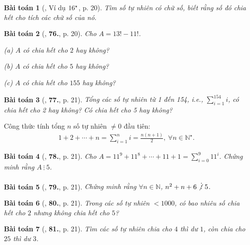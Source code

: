 \documentclass[oneside]{book}
\numberwithin{equation}{section}
\newtheorem{baitoan}{Bài toán}[section]
\begin{document}
\begin{baitoan}[\cite{Binh_Toan_6_tap_1}, Ví dụ $\rm 16^\star$, p. 20]
	Tìm số tự nhiên có chữ số, biết rằng số đó chia hết cho tích các chữ số của nó.
\end{baitoan}

\begin{baitoan}[\cite{Binh_Toan_6_tap_1}, \textbf{76.}, p. 20]
	Cho $A = 13! - 11!$.
	\begin{enumerate*}
		\item[(a)] $A$ có chia hết cho $2$ hay không?
		\item[(b)] $A$ có chia hết cho $5$ hay không?
		\item[(c)] $A$ có chia hết cho $155$ hay không?
	\end{enumerate*}
\end{baitoan}

\begin{baitoan}[\cite{Binh_Toan_6_tap_1}, \textbf{77.}, p. 21]
	Tổng các số tự nhiên từ 1 đến 154, i.e., $\sum_{i=1}^{154} i$, có chia hết cho 2 hay không? Có chia hết cho 5 hay không?
\end{baitoan}
Công thức tính tổng $n$ số tự nhiên $\ne 0$ đầu tiên:
\begin{align*}
	\boxed{1 + 2 + \cdots + n = \sum_{i=1}^n i = \frac{n(n + 1)}{2},\ \forall n\in\mathbb{N}^\star.}
\end{align*}

\begin{baitoan}[\cite{Binh_Toan_6_tap_1}, \textbf{78.}, p. 21]
	Cho $A = 11^9 + 11^8 + \cdots + 11 + 1 = \sum_{i=0}^9 11^i$. Chứng minh rằng $A\ \vdots\ 5$.
\end{baitoan}

\begin{baitoan}[\cite{Binh_Toan_6_tap_1}, \textbf{79.}, p. 21]
	Chứng minh rằng $\forall n\in\mathbb{N}$, $n^2 + n + 6\not\vdots\ 5$.
\end{baitoan}

\begin{baitoan}[\cite{Binh_Toan_6_tap_1}, \textbf{80.}, p. 21]
	Trong các số tự nhiên $< 1000$, có bao nhiêu số chia hết cho $2$ nhưng không chia hết cho $5$?
\end{baitoan}

\begin{baitoan}[\cite{Binh_Toan_6_tap_1}, \textbf{81.}, p. 21]
	Tìm các số tự nhiên chia cho $4$ thì dư $1$, còn chia cho $25$ thì dư $3$.
\end{baitoan}
\end{document}

